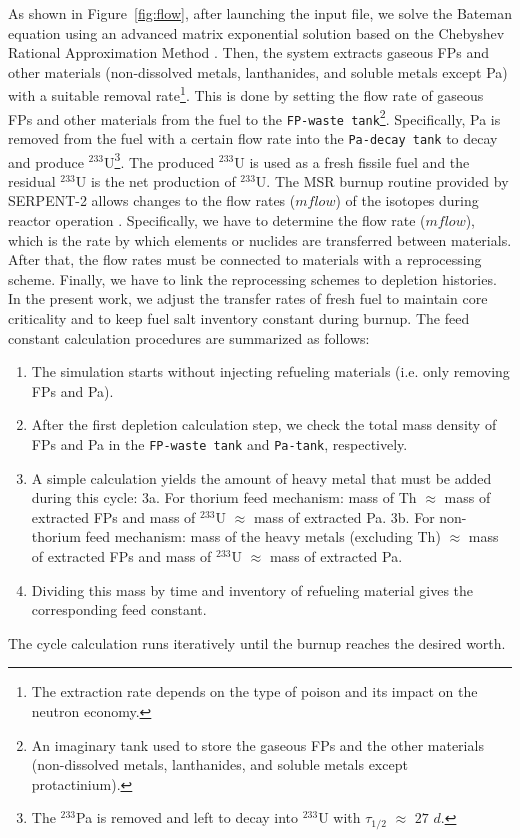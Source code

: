 As shown in Figure~\ref{fig:flow}, after launching the input file, we solve the Bateman equation using an advanced 
matrix exponential solution based on the Chebyshev Rational Approximation 
Method \cite{isotalo2016improving}. 
Then, the system extracts gaseous \gls{FPs} and other materials 
(non-dissolved metals, lanthanides, and soluble metals except Pa) with 
a suitable removal rate\footnote{The extraction rate depends on the type of 
poison and its impact on the neutron
economy.}. This is done by setting the 
flow rate of gaseous \gls{FPs} and other materials from the fuel to the 
\texttt{FP-waste tank}\footnote{An imaginary tank used to store the gaseous 
\gls{FPs} and the other materials (non-dissolved metals, lanthanides, and 
soluble metals except protactinium).}. Specifically, Pa is removed 
from the fuel with a certain flow rate into the 
\texttt{Pa-decay tank} to decay and produce $^{233}$U\footnote{The 
$^{233}$Pa is removed and left to decay into $^{233}$U with $\tau_{1/2}$ 
$\approx$ $27$ $d$.}. The produced $^{233}$U is used as a fresh fissile fuel 
and the residual $^{233}$U is the net production of $^{233}$U. The MSR burnup 
routine provided by SERPENT-2 allows changes to the flow rates ($mflow$) of the 
isotopes during reactor operation \cite{aufiero2013extended}. Specifically, we have to determine the flow rate ($mflow$), which is the rate by 
which elements or nuclides are transferred between materials. After that, the 
flow rates must be connected to materials with a reprocessing scheme. 
Finally, we have to link the reprocessing schemes to depletion histories. In 
the present work, we adjust the transfer rates of fresh fuel to maintain core 
criticality and to keep fuel salt inventory constant during burnup. The feed constant calculation procedures are summarized as follows:
\begin{enumerate}
	\item The simulation starts without injecting refueling materials (i.e. only removing FPs and Pa).
	\item After the first depletion calculation step, we check the total mass density of FPs and Pa in the \texttt{FP-waste tank} and \texttt{Pa-tank}, respectively.
	\item A simple calculation yields the amount of heavy metal that must be added during this cycle:
	\subitem 3a. For thorium feed mechanism: mass of Th $\approx$ mass of extracted FPs and mass of $^{233}$U $\approx$ mass of extracted Pa.
	\subitem 3b. For non-thorium feed mechanism: mass of the heavy metals (excluding Th) $\approx$ mass of extracted FPs and mass of $^{233}$U $\approx$ mass of extracted Pa.
	\item Dividing this mass by time and inventory of refueling material gives the corresponding feed constant.
\end{enumerate}
The cycle calculation runs iteratively until the burnup reaches the desired worth.

